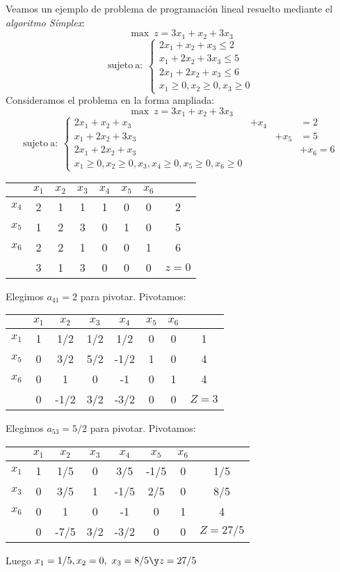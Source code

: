 \begin{ejem} Veamos un ejemplo de problema de programación lineal resuelto mediante el \textit{algoritmo Símplex}:
\[\max\ z= 3x_1+x_2+3x_3\]
\[\mathrm{sujeto\ a:\ }\left\{\begin{array}{rrrr}	2x_1+x_2+x_3\leq2 \\x_1+2x_2+3x_3\leq 5 \\2x_1+2x_2+x_3\leq6\\x_1\geq 0,x_2\geq 0,x_3\geq 0\end{array}	\right.\]
Consideramos el problema en la forma ampliada:
\[\max\ z= 3x_1+x_2+3x_3\]
\[\mathrm{sujeto\ a:\ }\left\{\begin{array}{rrrr}	2x_1+x_2+x_3&+x_4&&=2 \\x_1+2x_2+3x_3&&+x_5&= 5 \\2x_1+2x_2+x_3&&&+x_6=6\\x_1\geq 0,x_2\geq 0,x_3,x_4\geq 0,x_5\geq 0,x_6\geq 0\end{array}	\right.\]
\begin{center}\begin{tabular}{|c|ccc|ccc|c|}\hline
&$x_1$&$x_2$&$x_3$&$x_4$&$x_5$&$x_6$&\\\hline
$x_4$&\cellcolor{blue!25}2&1&1&1&0&0&2\\
$x_5$&1&2&3&0&1&0&5\\
$x_6$&2&2&1&0&0&1&6\\\hline
&3&1&3&0&0&0&$z=0$\\\hline
\end{tabular}\end{center}
Elegimos $a_{41}=2$ para pivotar. Pivotamos:
\begin{center}\begin{tabular}{|c|ccc|ccc|c|}\hline
&$x_1$&$x_2$&$x_3$&$x_4$&$x_5$&$x_6$&\\\hline
$x_1$&1&1/2&1/2&1/2&0&0&1\\
$x_5$&0&3/2&\cellcolor{blue!25}5/2&-1/2&1&0&4\\
$x_6$&0&1&0&-1&0&1&4\\\hline
&0&-1/2&3/2&-3/2&0&0&$Z=3$\\\hline
\end{tabular}\end{center}
Elegimos $a_{53}=5/2$ para pivotar. Pivotamos:
\begin{center}\begin{tabular}{|c|ccc|ccc|c|}\hline
&$x_1$&$x_2$&$x_3$&$x_4$&$x_5$&$x_6$&\\\hline
$x_1$&1&1/5&0&3/5&-1/5&0&1/5\\
$x_3$&0&3/5&1&-1/5&2/5&0&8/5\\
$x_6$&0&1&0&-1&0&1&4\\\hline
     &0&-7/5&3/2&-3/2&0&0&$Z=27/5$\\\hline
\end{tabular}\end{center}
Luego $x_1=1/5,x_2=0,\ x_3=8/5\y z=27/5$
\end{ejem}

